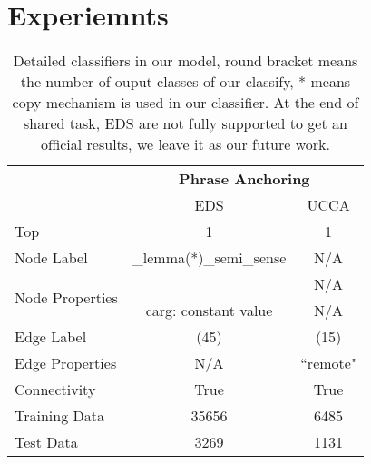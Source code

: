 \section{Experiemnts}
\label{sec:phr:exp}


\begin{table}[!ht]
\begin{center}
\small
\begin{tabular}{l|cc}
\toprule
\hline
                                 & \multicolumn{2}{c}{{\bf Phrase Anchoring}} \\ \cline{2-3}
                                 & EDS                     & UCCA             \\ \hline
Top                              & 1                       & 1                \\ \hline
Node Label                       & \_lemma(*)\_semi\_sense & N/A              \\ \hline
\multirow{2}{*}{Node Properties} &                         & N/A              \\
                                 & carg: constant value    & N/A              \\ \hline
Edge Label                       & (45)                    & (15)             \\ \hline
Edge Properties                  & N/A                     & ``remote"        \\ \hline
Connectivity                     & True                    & True             \\ \hline
Training Data                    & 35656                   & 6485             \\ \hline
Test Data                        & 3269                    & 1131             \\ \hline \bottomrule
\end{tabular}
\end{center}
\caption{Detailed classifiers in our model, round bracket means the
  number of ouput classes of our classify, * means copy mechanism is
  used in our classifier. At the end of shared task, EDS are not fully supported to get an official results, we leave it as our future work.}
\label{tbl:phr:impl_phrasal}
\end{table}


